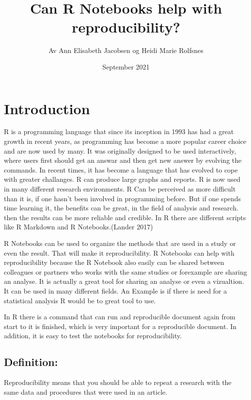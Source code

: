 \documentclass[
]{article}
\title{Can R Notebooks help with reproducibility?}
\author{Av Ann Elisabeth Jacobsen og Heidi Marie Rolfsnes}
\date{September 2021}
\begin{document}
\maketitle

\hypertarget{introduction}{%
\section{Introduction}\label{introduction}}

R is a programming language that since its inception in 1993 has had a
great growth in recent years, as programming has become a more popular
career choice and are now used by many. It was originally designed to be
used interactively, where users first should get an answar and then get
new answer by evolving the commands. In recent times, it has become a
language that has evolved to cope with greater challanges. R can produce
large graphs and reports. R is now used in many different research
environments. R Can be perceived as more difficult than it is, if one
hasn't been involved in programming before. But if one spends time
learning it, the benefits can be great, in the field of analysis and
research. then the results can be more reliable and credible. In R there
are different scripts like R Markdown and R Notebooks.(Lander 2017)

R Notebooks can be used to organize the methods that are used in a study
or even the result. That will make it reproducibility. R Notebooks can
help with reproducibility because the R Notebook also easily can be
shared between colleagues or partners who works with the same studies or
forexample are sharing an analyse. It is actually a great tool for
sharing an analyse or even a vizualtion. It can be used in many
different fields. An Example is if there is need for a statistical
analysis R would be to great tool to use.

In R there is a command that can run and reproducible document again
from start to it is finished, which is very important for a reproducible
document. In addition, it is easy to test the notebooks for
reproducibility.

\hypertarget{definition}{%
\subsection{Definition:}\label{definition}}

Reproducibility means that you should be able to repeat a research with
the same data and procedures that were used in an article.
\end{document}
